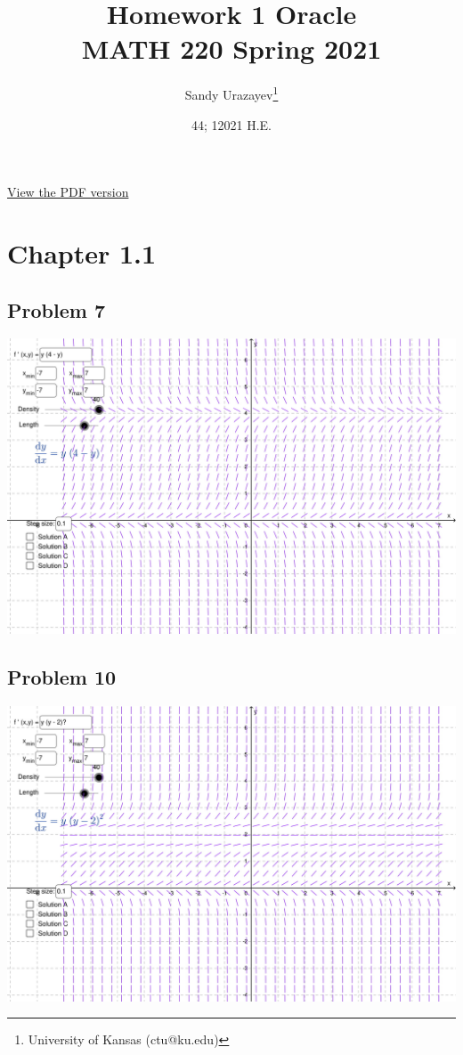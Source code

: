 \documentclass[12pt]{article}
\author{Sandy Urazayev\thanks{University of Kansas (ctu@ku.edu)}}
\date{44; 12021 H.E.}
\title{Homework 1 Oracle\\\medskip
\large MATH 220 Spring 2021}
\begin{document}
\maketitle
\href{./index.pdf}{View the PDF version​}

\section*{Chapter 1.1}
\label{sec:org8c1fbcd}
\subsection*{Problem 7}
\label{sec:org70a5c8b}
\begin{center}
\includegraphics[width=.9\linewidth]{./7.jpg}
\end{center}
\subsection*{Problem 10}
\label{sec:orgffbd5f5}
\begin{center}
\includegraphics[width=.9\linewidth]{./10.jpg}
\end{center}
\end{document}
